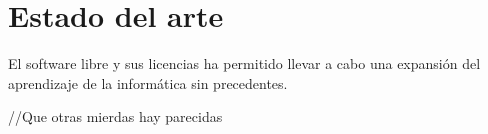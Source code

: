 \chapter{Estado del arte}

El software libre y sus licencias \cite{gplv3} ha permitido llevar a cabo una expansión del
aprendizaje de la informática sin precedentes.


//Que otras mierdas hay parecidas